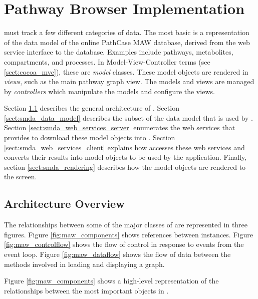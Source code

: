 \section{Pathway Browser Implementation}
\label{sect:maw_implementation}

\mawapp must track a few different categories of data. The most basic is a
representation of the data model of the online PathCase MAW database, derived
from the web service interface to the database. Examples include pathways,
metabolites, compartments, and processes. In Model-View-Controller terms (see
\ref{sect:cocoa_mvc}), these are \emph{model} classes.  These model
objects are rendered in \emph{views}, such as the main pathway graph view.
The models and views are managed by \emph{controllers} which manipulate the
models and configure the views.

Section \ref{sect:smda_arch_overview} describes the general architecture of
\mawapp. Section \ref{sect:smda_data_model} describes the subset of the
\pathcasemaw data model that is used by \mawapp. Section
\ref{sect:smda_web_services_server} enumerates the web services that
\pathcasemaw provides to download these model objects into \mawapp. Section
\ref{sect:smda_web_services_client} explains how \mawapp accesses these web
services and converts their results into model objects to be used by the
application. Finally, section \ref{sect:smda_rendering} describes how the model
objects are rendered to the screen.

\subsection{Architecture Overview}
\label{sect:smda_arch_overview}

The relationships between some of the major classes of \mawapp are represented
in three figures. Figure \ref{fig:maw_components} shows references between
instances. Figure \ref{fig:maw_controlflow} shows the flow of control in
response to events from the event loop. Figure \ref{fig:maw_dataflow} shows the
flow of data between the methods involved in loading and displaying a graph.

Figure \ref{fig:maw_components} shows a high-level representation of the
relationships between the most important objects in \mawapp.

